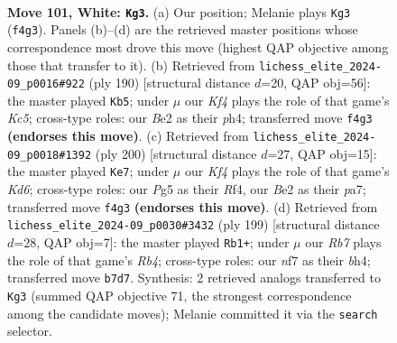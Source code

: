 \documentclass[11pt]{article}
\begin{document}
\begin{figure}[p]\centering
\begin{subfigure}{0.46\textwidth}\centering
\resizebox{\linewidth}{!}{%
\newchessgame
\chessboard[
  setfen={r7/PR3nk1/8/6P1/5K2/7P/2P1B3/8 w - - 1 101},
  showmover=false,
  pgfstyle=straightmove, color=movearrow, markmove={f4-g3}
]}
\caption{}
\end{subfigure}\hfill
\begin{subfigure}{0.46\textwidth}\centering
\resizebox{\linewidth}{!}{%
\newchessgame
\chessboard[
  setfen={8/8/r7/P1K2kP1/R4n1p/7P/8/8 w - - 0 96},
  showmover=false,
  pgfstyle=straightmove, color=movearrow, markmove={c5-b5}
]}
\caption{}
\end{subfigure}
\\[4pt]
\begin{subfigure}{0.46\textwidth}\centering
\resizebox{\linewidth}{!}{%
\newchessgame
\chessboard[
  setfen={5r2/p1P2P2/3K4/6k1/5R2/P7/8/8 w - - 1 101},
  showmover=false,
  pgfstyle=straightmove, color=movearrow, markmove={d6-e7}
]}
\caption{}
\end{subfigure}\hfill
\begin{subfigure}{0.46\textwidth}\centering
\resizebox{\linewidth}{!}{%
\newchessgame
\chessboard[
  setfen={5R2/3k4/8/1r3p2/6pB/7p/8/6K1 b - - 97 100},
  showmover=false,
  pgfstyle=straightmove, color=movearrow, markmove={b5-b1}
]}
\caption{}
\end{subfigure}
\caption{\textbf{Move 101, White: \texttt{Kg3}.} (a) Our position; Melanie plays \texttt{Kg3} (\texttt{f4g3}). Panels (b)--(d) are the retrieved master positions whose correspondence most drove this move (highest QAP objective among those that transfer to it). (b) Retrieved from \texttt{lichess\_elite\_2024-09\_p0016\#922} (ply 190) [structural distance $d$=20, QAP obj=56]: the master played \texttt{Kb5}; under $\mu$ our \emph{Kf4} plays the role of that game's \emph{Kc5}; cross-type roles: our \emph{B}e2 as their \emph{p}h4; transferred move \texttt{f4g3} \textbf{(endorses this move)}. (c) Retrieved from \texttt{lichess\_elite\_2024-09\_p0018\#1392} (ply 200) [structural distance $d$=27, QAP obj=15]: the master played \texttt{Ke7}; under $\mu$ our \emph{Kf4} plays the role of that game's \emph{Kd6}; cross-type roles: our \emph{P}g5 as their \emph{R}f4, our \emph{B}e2 as their \emph{p}a7; transferred move \texttt{f4g3} \textbf{(endorses this move)}. (d) Retrieved from \texttt{lichess\_elite\_2024-09\_p0030\#3432} (ply 199) [structural distance $d$=28, QAP obj=7]: the master played \texttt{Rb1+}; under $\mu$ our \emph{Rb7} plays the role of that game's \emph{Rb4}; cross-type roles: our \emph{n}f7 as their \emph{b}h4; transferred move \texttt{b7d7}. Synthesis: 2 retrieved analogs transferred to \texttt{Kg3} (summed QAP objective 71, the strongest correspondence among the candidate moves); Melanie committed it via the \texttt{search} selector.}
\label{fig:thought-m200}
\end{figure}
\end{document}
